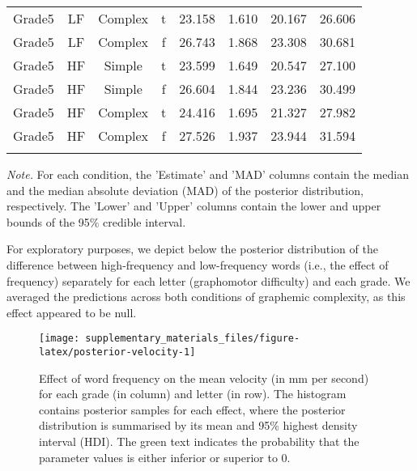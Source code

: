 \documentclass[
  11pt,
  english,
  ,doc,floatsintext]{apa6}
\begin{document}
\begin{table}[htb]
\begin{center}
\begin{threeparttable}
{\begin{tabular}{cccccccc}
Grade5 & LF & Complex & t & 23.158 & 1.610 & 20.167 & 26.606\\
Grade5 & LF & Complex & f & 26.743 & 1.868 & 23.308 & 30.681\\
Grade5 & HF & Simple & t & 23.599 & 1.649 & 20.547 & 27.100\\
Grade5 & HF & Simple & f & 26.604 & 1.844 & 23.236 & 30.499\\
Grade5 & HF & Complex & t & 24.416 & 1.695 & 21.327 & 27.982\\
Grade5 & HF & Complex & f & 27.526 & 1.937 & 23.944 & 31.594\\
\bottomrule
\addlinespace
\end{tabular}

}

\begin{tablenotes}[para]
\normalsize{\textit{Note.} For each condition, the 'Estimate' and 'MAD' columns contain the
    median and the median absolute deviation (MAD) of the posterior distribution,
    respectively. The 'Lower' and 'Upper' columns contain the lower and upper
    bounds of the 95\% credible interval.}
\end{tablenotes}

\end{threeparttable}
\end{center}

\end{table}

For exploratory purposes, we depict below the posterior distribution of the difference between high-frequency and low-frequency words (i.e., the effect of frequency) separately for each letter (graphomotor difficulty) and each grade. We averaged the predictions across both conditions of graphemic complexity, as this effect appeared to be null.

\begin{figure}[!htb]

{\centering \texttt{[image: supplementary\_materials\_files/figure-latex/posterior-velocity-1]} 

}

\caption{Effect of word frequency on the mean velocity (in mm per second) for each grade (in column) and letter (in row). The histogram contains posterior samples for each effect, where the posterior distribution is summarised by its mean and 95\% highest density interval (HDI). The green text indicates the probability that the parameter values is either inferior or superior to 0.}\label{fig:posterior-velocity}
\end{figure}
\end{document}
